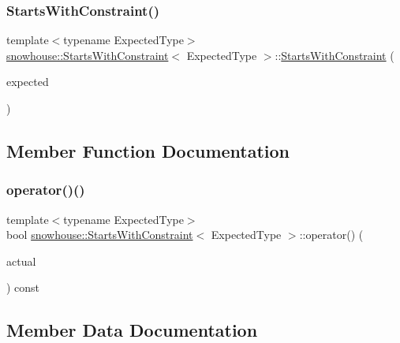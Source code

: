 \subsubsection{\texorpdfstring{StartsWithConstraint()}{StartsWithConstraint()}}
{\footnotesize\ttfamily template$<$typename Expected\+Type$>$ \\
\mbox{\hyperlink{structsnowhouse_1_1StartsWithConstraint}{snowhouse\+::\+Starts\+With\+Constraint}}$<$ Expected\+Type $>$\+::\mbox{\hyperlink{structsnowhouse_1_1StartsWithConstraint}{Starts\+With\+Constraint}} (\begin{DoxyParamCaption}\item[{const Expected\+Type \&}]{expected }\end{DoxyParamCaption})\hspace{0.3cm}{\ttfamily [inline]}}



\subsection{Member Function Documentation}
\mbox{\label{structsnowhouse_1_1StartsWithConstraint_a354ad0f942acf22874b367bc01ae9531}} 
\subsubsection{\texorpdfstring{operator()()}{operator()()}}
{\footnotesize\ttfamily template$<$typename Expected\+Type$>$ \\
bool \mbox{\hyperlink{structsnowhouse_1_1StartsWithConstraint}{snowhouse\+::\+Starts\+With\+Constraint}}$<$ Expected\+Type $>$\+::operator() (\begin{DoxyParamCaption}\item[{const std\+::string \&}]{actual }\end{DoxyParamCaption}) const\hspace{0.3cm}{\ttfamily [inline]}}



\subsection{Member Data Documentation}
\mbox{\label{structsnowhouse_1_1StartsWithConstraint_a5ed40c137612f3b214948d93dc6feaa5}} 

